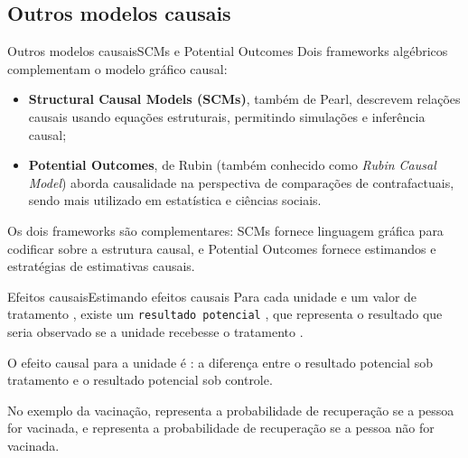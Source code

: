 \subsection{Outros modelos causais}

\begin{frame}{Outros modelos causais}{SCMs e Potential Outcomes}
    Dois frameworks algébricos complementam o modelo gráfico causal:
    \begin{itemize}
        \item \textbf{Structural Causal Models (SCMs)}, também de Pearl, descrevem relações causais usando equações estruturais, permitindo simulações e inferência causal;
        \item \textbf{Potential Outcomes}, de Rubin (também conhecido como \textit{Rubin Causal Model}) aborda causalidade na perspectiva de comparações de contrafactuais, sendo mais utilizado em estatística e ciências sociais.
    \end{itemize}

    \pause

    Os dois frameworks são complementares: SCMs fornece linguagem gráfica para codificar sobre a estrutura causal, e Potential Outcomes fornece estimandos e estratégias de estimativas causais.
\end{frame}

\begin{frame}{Efeitos causais}{Estimando efeitos causais}
    Para cada unidade  e um valor de tratamento , existe um \texttt{resultado potencial} , que representa o resultado que seria observado se a unidade  recebesse o tratamento .

    \vspace{20pt}
    \pause
    
    O efeito causal para a unidade  é : a diferença entre o resultado potencial sob tratamento e o resultado potencial sob controle.
    
    \vspace{20pt}
    \pause

    No exemplo da vacinação,  representa a probabilidade de recuperação se a pessoa for vacinada, e  representa a probabilidade de recuperação se a pessoa não for vacinada.
\end{frame}

